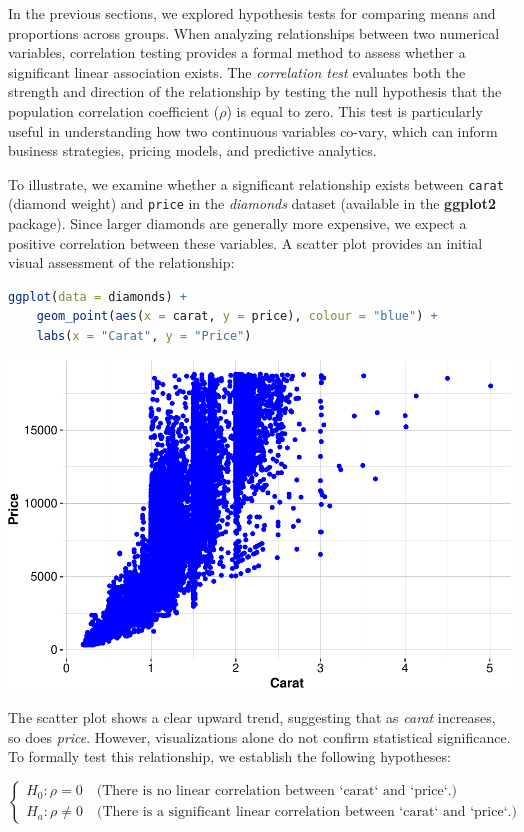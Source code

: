 \documentclass[
]{book}
\newcommand{\passthrough}[1]{#1}
\theoremstyle{definition}
\theoremstyle{definition}
\theoremstyle{definition}
\theoremstyle{definition}
\theoremstyle{remark}
\begin{document}
In the previous sections, we explored hypothesis tests for comparing means and proportions across groups. When analyzing relationships between two numerical variables, correlation testing provides a formal method to assess whether a significant linear association exists. The \emph{correlation test} evaluates both the strength and direction of the relationship by testing the null hypothesis that the population correlation coefficient (\(\rho\)) is equal to zero. This test is particularly useful in understanding how two continuous variables co-vary, which can inform business strategies, pricing models, and predictive analytics.

To illustrate, we examine whether a significant relationship exists between \passthrough{\lstinline!carat!} (diamond weight) and \passthrough{\lstinline!price!} in the \emph{diamonds} dataset (available in the \textbf{ggplot2} package). Since larger diamonds are generally more expensive, we expect a positive correlation between these variables. A scatter plot provides an initial visual assessment of the relationship:

\begin{lstlisting}[language=R]
ggplot(data = diamonds) +
    geom_point(aes(x = carat, y = price), colour = "blue") +
    labs(x = "Carat", y = "Price") 
\end{lstlisting}

\begin{center}\includegraphics[width=0.7\linewidth]{statistics_files/figure-latex/unnamed-chunk-18-1} \end{center}

The scatter plot shows a clear upward trend, suggesting that as \emph{carat} increases, so does \emph{price}. However, visualizations alone do not confirm statistical significance. To formally test this relationship, we establish the following hypotheses:

\[
\begin{cases}
    H_0: \rho   =  0 \quad \text{(There is no linear correlation between `carat` and `price`.)} \\
    H_a: \rho \neq 0 \quad \text{(There is a significant linear correlation between `carat` and `price`.)}
\end{cases}
\]
\end{document}
